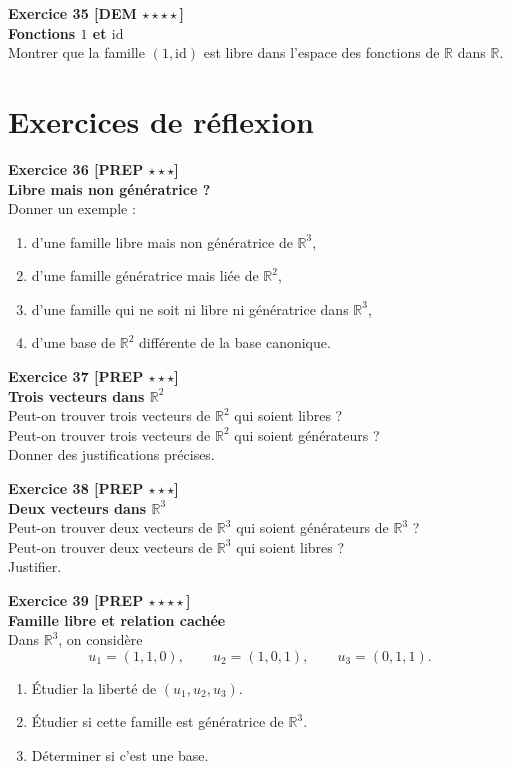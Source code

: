 \documentclass[11pt,a4paper]{article}
\begin{document}
\textbf{Exercice 35 [DEM $\star\star\star\star$]}\\
\textbf{Fonctions \(1\) et \(\mathrm{id}\)}\\
Montrer que la famille \((1,\mathrm{id})\) est libre dans l’espace des fonctions de \(\mathbb{R}\) dans \(\mathbb{R}\).

\newpage

\section*{Exercices de réflexion}

\textbf{Exercice 36 [PREP $\star\star\star$]}\\
\textbf{Libre mais non génératrice ?}\\
Donner un exemple :
\begin{enumerate}[label=\alph*)]
    \item d’une famille libre mais non génératrice de \(\mathbb{R}^3\),
    \item d’une famille génératrice mais liée de \(\mathbb{R}^2\),
    \item d’une famille qui ne soit ni libre ni génératrice dans \(\mathbb{R}^3\),
    \item d’une base de \(\mathbb{R}^2\) différente de la base canonique.
\end{enumerate}

\textbf{Exercice 37 [PREP $\star\star\star$]}\\
\textbf{Trois vecteurs dans \(\mathbb{R}^2\)}\\
Peut-on trouver trois vecteurs de \(\mathbb{R}^2\) qui soient libres ?\\
Peut-on trouver trois vecteurs de \(\mathbb{R}^2\) qui soient générateurs ?\\
Donner des justifications précises.

\textbf{Exercice 38 [PREP $\star\star\star$]}\\
\textbf{Deux vecteurs dans \(\mathbb{R}^3\)}\\
Peut-on trouver deux vecteurs de \(\mathbb{R}^3\) qui soient générateurs de \(\mathbb{R}^3\) ?\\
Peut-on trouver deux vecteurs de \(\mathbb{R}^3\) qui soient libres ?\\
Justifier.

\textbf{Exercice 39 [PREP $\star\star\star\star$]}\\
\textbf{Famille libre et relation cachée}\\
Dans \(\mathbb{R}^3\), on considère
\[
u_1=(1,1,0),\qquad u_2=(1,0,1),\qquad u_3=(0,1,1).
\]
\begin{enumerate}[label=\alph*)]
    \item Étudier la liberté de \((u_1,u_2,u_3)\).
    \item Étudier si cette famille est génératrice de \(\mathbb{R}^3\).
    \item Déterminer si c’est une base.
\end{enumerate}
\end{document}
